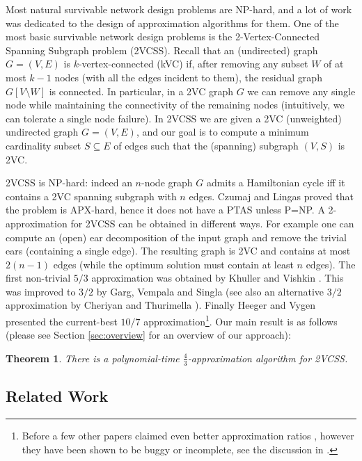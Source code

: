 \documentclass{article}
\newtheorem{theorem}{Theorem}\newtheorem{lemma}[theorem]{Lemma}\newtheorem{proposition}[theorem]{Proposition}\newtheorem{corollary}[theorem]{Corollary}\newtheorem{definition}[theorem]{Definition}\newtheorem{claim}[theorem]{Claim}\newtheorem{remark}[theorem]{Remark}\newtheorem{observation}[theorem]{Observation}\newtheorem{conjecture}[theorem]{Conjecture}\newtheorem{example}[theorem]{Example}
\begin{document}
Most natural survivable network design problems are NP-hard, and a lot of work was dedicated to the design of approximation algorithms for them. One of the most basic survivable network design problems is the 2-Vertex-Connected Spanning Subgraph problem (2VCSS). Recall that an (undirected) graph $G=(V,E)$ is $k$-vertex-connected (kVC) if, after removing any subset $W$ of at most $k-1$ nodes (with all the edges incident to them), the residual graph $G[V\setminus W]$ is connected. In particular, in a 2VC graph $G$ we can remove any single node while maintaining the connectivity of the remaining nodes (intuitively, we can tolerate a single node failure). In 2VCSS we are given a 2VC (unweighted) undirected graph $G=(V,E)$, and our goal is to compute a minimum cardinality subset $S\subseteq E$ of edges such that the (spanning) subgraph $(V,S)$ is 2VC. 

2VCSS is NP-hard: indeed an $n$-node graph $G$ admits a Hamiltonian cycle iff it contains a 2VC spanning subgraph with $n$ edges. Czumaj and Lingas \cite{CL99} proved that the problem is APX-hard, hence it does not have a PTAS unless P=NP. A 2-approximation for 2VCSS can be obtained in different ways. For example one can compute an (open) ear decomposition of the input graph and remove the trivial ears (containing a single edge). The resulting graph is 2VC and contains at most $2(n-1)$ edges (while the optimum solution must contain at least $n$ edges). 
The first non-trivial $5/3$ approximation was obtained by Khuller and Vishkin \cite{KV94}. This was improved to $3/2$ by Garg, Vempala and Singla \cite{GVS93} (see also an alternative $3/2$ approximation by Cheriyan and Thurimella \cite{CT00}). Finally Heeger and Vygen \cite{HV17} presented the current-best $10/7$ approximation\footnote{Before \cite{HV17} a few other papers claimed even better approximation ratios \cite{GR05,JRV03}, however they have been shown to be buggy or incomplete, see the discussion in \cite{HV17}.}. Our main result is as follows (please see Section \ref{sec:overview} for an overview of our approach):   

\begin{theorem}\label{thm:mainTheorem}
There is a polynomial-time $\frac{4}{3}$-approximation algorithm for 2VCSS.    
\end{theorem}


\subsection{Related Work}
\end{document}
